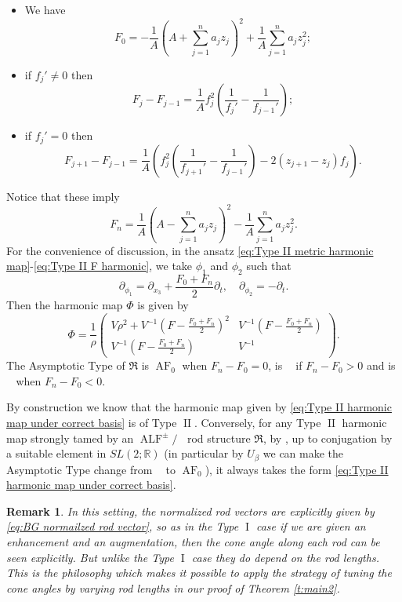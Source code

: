 \documentclass[a4paper,11pt]{amsart}
\newtheorem{remark}[theorem]{Remark}
\theoremstyle{definition}
\numberwithin{equation}{section}
\newcommand{\mR} {\mathfrak R}
\DeclareMathOperator{\I}{I}
\DeclareMathOperator{\II}{II}
\DeclareMathOperator{\ALF}{ALF}
\DeclareMathOperator{\ALFp}{ALF^+}
\DeclareMathOperator{\ALFm}{ALF^{--}}
\DeclareMathOperator{\AF}{AF}
\DeclareMathOperator{\AFa}{AF_\beta}
\begin{document}
\begin{itemize}
\item We have $$F_0=-\frac{1}{A}(A+\sum_{j=1}^na_jz_j)^2+\frac{1}{A}\sum_{j=1}^na_jz_j^2;$$
    \item if $f_j'\neq0$ then \begin{equation}
        F_j-F_{j-1}=\frac{1}{A}f_j^2(\frac{1}{f_j'}-\frac{1}{f_{j-1}'});
    \end{equation}
    \item if $f_j'=0$ then \begin{equation}
        F_{j+1}-F_{j-1}=\frac{1}{A}(f_j^2(\frac{1}{f_{j+1}'}-\frac{1}{f_{j-1}'})-2(z_{j+1}-z_j)f_j).
    \end{equation}
\end{itemize}
Notice that these imply  $$F_n=\frac{1}{A}(A-\sum_{j=1}^na_jz_j)^2-\frac{1}{A}\sum_{j=1}^na_jz_j^2.$$
For the convenience of discussion, in the ansatz \eqref{eq:Type II metric harmonic map}-\eqref{eq:Type II F harmonic}, we take $\phi_1$ and $\phi_2$ such that $$\partial_{\phi_1}=\partial_{x_3}+\frac{F_0+F_n}{2}\partial_t, \quad \partial_{\phi_2}=-\partial_t.$$ Then  the harmonic map $\Phi$ is given by
\begin{equation}\label{eq:Type II harmonic map under correct basis}
    \Phi=\frac{1}{\rho}\left(\begin{matrix}
        V\rho^2+V^{-1}(F-\frac{F_0+F_n}{2})^2 & V^{-1}(F-\frac{F_0+F_n}{2}) \\ V^{-1}(F-\frac{F_0+F_n}{2}) & V^{-1}
    \end{matrix}\right).
\end{equation}
The  Asymptotic Type  of $\mR$ is $\AF_0$ when $F_n-F_0=0$, is $\ALFm$ if $F_n-F_0>0$ and is $\ALFp$ when  $F_n-F_0<0$.

By construction we know that the harmonic map given by \eqref{eq:Type II harmonic map under correct basis} is of Type $\II$.  Conversely, for any Type $\II$ harmonic map strongly tamed by an $\ALF^\pm/\AFa$ rod structure $\mR$, by \cite{BG}, up to conjugation by a suitable element in $SL(2;\mathbb{R})$ (in particular by $U_\beta$ we can make the Asymptotic Type change from $\AFa$ to $\AF_0$), it always takes the form \eqref{eq:Type II harmonic map under correct basis}. 

\begin{remark}\label{rem: angle in Type II}
    In this setting, the normalized rod vectors are explicitly given by \eqref{eq:BG normailzed rod vector}, so as in the Type $\I$ case if we are given an enhancement and an augmentation, then the cone angle along each rod can be seen explicitly.  But unlike the Type $\I$ case they do depend on the rod lengths. This is the philosophy which makes it possible to apply the strategy of tuning the cone angles by varying rod lengths in our proof of Theorem \ref{t:main2}.
\end{remark}
\end{document}
